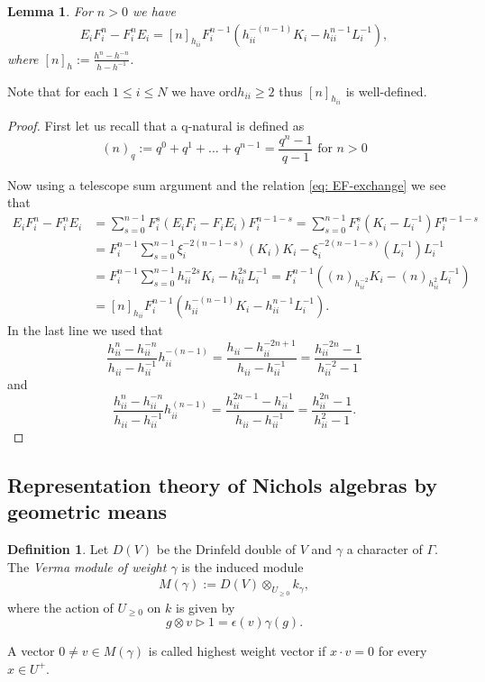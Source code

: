 \documentclass{amsart}
\newtheorem{lemma}[theorem]{Lemma}
\theoremstyle{definition}
\newtheorem{definition}[theorem]{Definition}
\begin{document}
\begin{lemma}{{\cite[4.3]{Joseph1995}}} \label{lem: ItteratedEFExchange}
	For $n>0$ we have
	\begin{align}
	E_i F_i^n - F_i^n E_i = [n]_{h_{ii}} F_i^{n-1} \left( h_{ii}^{-(n-1)} K_i- h_{ii}^{n-1} L_i^{-1} \right), 
	\end{align} 
	where $[n]_h:= \frac{h^n-h^{-n}}{h-h^{-1}}$.
\end{lemma}
Note that for each $1\leq i\leq N$ we have 
$\text{ord} h_{ii} \geq 2$ thus 
$[n]_{h_{ii}}$ is well-defined.
\begin{proof}	
	First let us recall that a q-natural is defined as
	$$
	(n)_q := q^{0} + q^1 + \dotsc +q^{n-1} = \frac{q^{n} - 1}{q -1} \text{ for } n>0
	$$
	
	Now using a telescope sum argument and the relation \eqref{eq: EF-exchange} we see that
	\begin{align*}
	E_i F_i^n - F_i^n E_i &= \sum_{s=0}^{n-1} F_i^{s} (E_i F_i - F_iE_i)F_i^{n-1-s} =
	\sum_{s=0}^{n-1} F_i^{s} (K_i- L_i^{-1})F_i^{n-1-s} \\
	& = F_i^{n-1} \sum_{s=0}^{n-1} \xi_i^{-2(n-1-s)}(K_i) K_i - 
	\xi_i^{-2(n-1-s)}(L_i^{-1}) L_i^{-1}  \\
	& =  F_i^{n-1} \sum_{s=0}^{n-1} h_{ii}^{-2s} K_i - h_{ii}^{2s} L_i^{-1}
	= F_i^{n-1} \left ((n)_{h_{ii}^{-2}} K_i- (n)_{h_{ii}^2} L_i^{-1} \right)\\
	& = [n]_{h_{ii}} F_i^{n-1} \left( h_{ii}^{-(n-1)} K_i- h_{ii}^{n-1} L_i^{-1} \right).
	\end{align*}
	In the last line we used that
	$$
	\frac{h_{ii}^n-h_{ii}^{-n}}{h_{ii}-h_{ii}^{-1}}h_{ii}^{-(n-1)} =  
	\frac{h_{ii}- h_{ii}^{-2n +1}}{h_{ii} - h_{ii}^{-1}} = 
	\frac{h_{ii}^{-2n} - 1}{h_{ii}^{-2} - 1}
	$$	
	and
	$$
	\frac{h_{ii}^n-h_{ii}^{-n}}{h_{ii}-h_{ii}^{-1}}h_{ii}^{(n-1)} =  
	\frac{h_{ii}^{2n -1}- h_{ii}^{-1}}{h_{ii} - h_{ii}^{-1}} = 
	\frac{h_{ii}^{2n} - 1}{h_{ii}^{2} - 1}.
	$$
\end{proof}

\subsection{Representation theory of Nichols algebras by geometric means}

\begin{definition}
	Let $D(V)$ be the Drinfeld double of $V$ and $\gamma$ a character of $\Gamma$.
	The \emph{Verma module of weight $\gamma$} is the induced module 
	\begin{align}
		M(\gamma) := D(V) \otimes_{U_{\geq 0}} k_\gamma,
	\end{align}
	where the action of $U_{\geq 0}$ on $k$ is given by 
	$$
		g\otimes v \triangleright 1 = \epsilon(v)\gamma(g).
	$$
	
	A vector $0 \neq v \in M(\gamma)$ is called highest weight vector if
	$x \cdot v =0 $ for every $x \in U^+$.
\end{definition}
\end{document}
